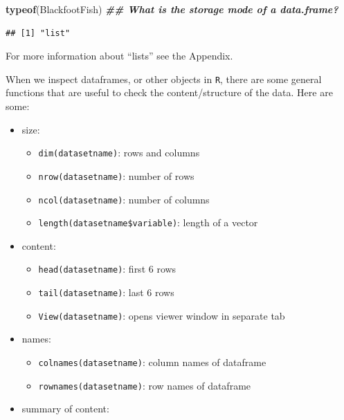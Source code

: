 \documentclass[
  10pt,
  letterpaper,
  twoside,
  openright]{book}
\newenvironment{Shaded}{\begin{snugshade}}{\end{snugshade}}
\newcommand{\DocumentationTok}[1]{\textcolor[rgb]{0.56,0.35,0.01}{\textbf{\textit{#1}}}}
\newcommand{\FunctionTok}[1]{\textcolor[rgb]{0.13,0.29,0.53}{\textbf{#1}}}
\newcommand{\NormalTok}[1]{#1}
\providecommand{\tightlist}{%
  \setlength{\itemsep}{0pt}\setlength{\parskip}{0pt}}
\begin{document}
\begin{Shaded}
\begin{Highlighting}[]
\FunctionTok{typeof}\NormalTok{(BlackfootFish) }\DocumentationTok{\#\# What is the storage mode of a data.frame?}
\end{Highlighting}
\end{Shaded}

\begin{verbatim}
## [1] "list"
\end{verbatim}

For more information about ``lists'' see the Appendix.

When we inspect dataframes, or other objects in \texttt{R}, there are
some general functions that are useful to check the content/structure of
the data. Here are some:

\begin{itemize}
\tightlist
\item
  size:

  \begin{itemize}
  \tightlist
  \item
    \texttt{dim(datasetname)}: rows and columns\\
  \item
    \texttt{nrow(datasetname)}: number of rows\\
  \item
    \texttt{ncol(datasetname)}: number of columns\\
  \item
    \texttt{length(datasetname\$variable)}: length of a vector
  \end{itemize}
\item
  content:

  \begin{itemize}
  \tightlist
  \item
    \texttt{head(datasetname)}: first 6 rows\\
  \item
    \texttt{tail(datasetname)}: last 6 rows\\
  \item
    \texttt{View(datasetname)}: opens viewer window in separate tab
  \end{itemize}
\item
  names:

  \begin{itemize}
  \tightlist
  \item
    \texttt{colnames(datasetname)}: column names of dataframe\\
  \item
    \texttt{rownames(datasetname)}: row names of dataframe
  \end{itemize}
\item
  summary of content:


\end{itemize}
\end{document}
